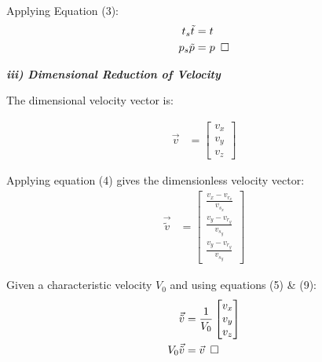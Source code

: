 \documentclass[titlepage]{article}
\begin{document}
Applying Equation (3):
\begin{align}
    t_{s}\tilde{t}  &= t\\
    p_{s}\tilde{p} &= p\hspace*{5pt}\square 
\end{align} 
\begin{center}
    \textbf{\emph{iii) Dimensional Reduction of Velocity}}
\end{center}

\noindent The dimensional velocity vector is:

\begin{align}
    \vec{v} &= \begin{bmatrix}
        v_{x} \\
        v_{y} \\
        v_{z} 
    \end{bmatrix}
\end{align}

\noindent Applying equation (4) gives the dimensionless velocity vector:
\begin{align}
    \vec{\tilde{v}} &= \begin{bmatrix}
        \displaystyle\frac{v_{x}-v_{r_{x}}}{v_{s_{x}}} \\[10pt]
        \displaystyle\frac{v_{y}-v_{r_{y}}}{v_{s_{y}}} \\[10pt]
        \displaystyle\frac{v_{y}-v_{r_{y}}}{v_{s_{y}}} 
    \end{bmatrix}
\end{align}

\newpage
\noindent Given a characteristic velocity $V_{0}$ and using equations (5) \& (9): 
\begin{align}
    \vec{\tilde{v}} &= \displaystyle\frac{1}{V_{0}}\begin{bmatrix}
        v_{x} \\
        v_{y} \\
        v_{z}     
    \end{bmatrix} \\
    {V_{0}}\vec{\tilde{v}} &= \vec{v}\hspace*{5pt}\square
\end{align}
\end{document}
